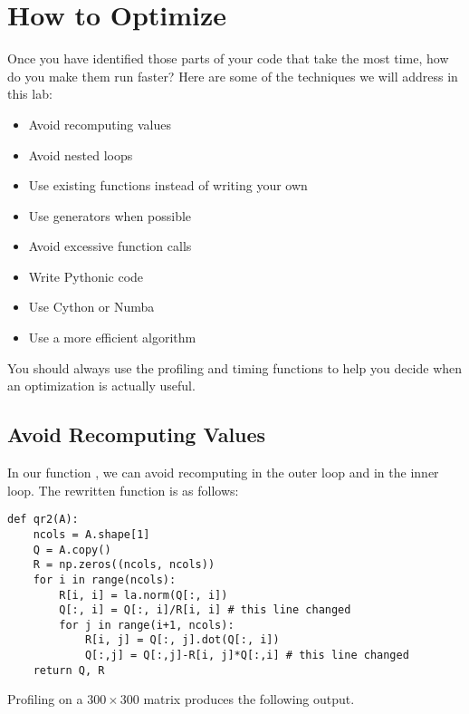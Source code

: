 \section*{How to Optimize}
Once you have identified those parts of your code that take the most time, how do you make them run faster?
Here are some of the techniques we will address in this lab:
\begin{itemize}
\item Avoid recomputing values
\item Avoid nested loops
\item Use existing functions instead of writing your own
\item Use generators when possible
\item Avoid excessive function calls
\item Write Pythonic code
\item Use Cython or Numba
\item Use a more efficient algorithm
\end{itemize}
You should always use the profiling and timing functions to help you decide when an optimization is actually useful.

\subsection*{Avoid Recomputing Values}
In our function , we can avoid recomputing  in the outer loop and  in the inner loop.
The rewritten function is as follows:
\begin{lstlisting}
def qr2(A):
    ncols = A.shape[1]
    Q = A.copy()
    R = np.zeros((ncols, ncols))
    for i in range(ncols):
        R[i, i] = la.norm(Q[:, i])
        Q[:, i] = Q[:, i]/R[i, i] # this line changed
        for j in range(i+1, ncols):
            R[i, j] = Q[:, j].dot(Q[:, i])
            Q[:,j] = Q[:,j]-R[i, j]*Q[:,i] # this line changed
    return Q, R
\end{lstlisting}

Profiling  on a $300 \times 300$ matrix produces the following output.

